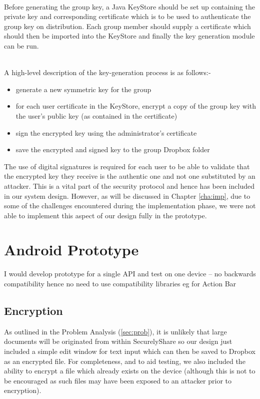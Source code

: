 \\

Before generating the group key, a Java KeyStore should be set up containing the private key and corresponding certificate which is to be used to authenticate the group key on distribution.  Each group member should supply a certificate which should then be imported into the KeyStore and finally the key generation module can be run.  

\\

A high-level description of the key-generation process is as follows:-
\begin{itemize}
\item generate a new  symmetric key for the group
\item for each user certificate in the KeyStore, encrypt a copy of the group key with the user's public key (as contained in the certificate)
\item sign the encrypted key using the administrator's certificate
\item save the encrypted and signed key to the group Dropbox folder 
\end{itemize}

The use of digital signatures is required for each user to be able to validate that the encrypted key they receive is the authentic one and not one substituted by an attacker.  This  is a vital part of the  security protocol and hence has been included in our  system design.  However, as will be discussed in Chapter \ref{cha:imp}, due to some of the challenges encountered during the implementation phase, we were not able to implement this aspect of our design fully in the prototype.


\section{Android Prototype }

I would develop prototype for a single API and test on one device – no backwards compatibility hence no need to use compatibility libraries eg for Action Bar


\subsection*{Encryption }
As outlined in the Problem Analysis  (\ref{sec:prob}), it is unlikely that large documents will be originated from within SecurelyShare so our design just included a simple  edit window for text input which can then be saved to Dropbox as an encrypted file.  For completeness, and to aid testing, we also included the ability to encrypt a file which already exists on the device (although this is not to be encouraged as such files may have been exposed to an attacker prior to encryption).



